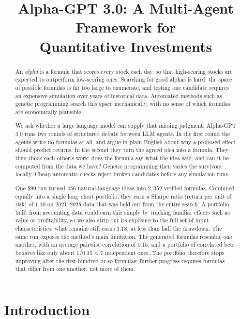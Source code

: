 \documentclass{article}
\title{Alpha-GPT 3.0: A Multi-Agent Framework for\\ Quantitative Investments}
\theoremstyle{definition}
\theoremstyle{plain}
\theoremstyle{remark}
\begin{document}
\maketitle

\begin{abstract}
An \emph{alpha} is a formula that scores every stock each day, so that high-scoring
stocks are expected to outperform low-scoring ones. Searching for good alphas is hard:
the space of possible formulas is far too large to enumerate, and testing one candidate
requires an expensive simulation over years of historical data. Automated methods such
as genetic programming search this space mechanically, with no sense of which formulas
are economically plausible.

We ask whether a large language model can supply that missing judgment. Alpha-GPT 3.0
runs two rounds of structured debate between LLM agents. In the first round the agents
write no formulas at all, and argue in plain English about why a proposed effect should
predict returns. In the second they turn the agreed idea into a formula. They then check
each other's work: does the formula say what the idea said, and can it be computed from
the data we have? Genetic programming then varies the survivors locally. Cheap automatic
checks reject broken candidates before any simulation runs.

One \$99 run turned 456 natural-language ideas into $2{,}352$ verified formulas.
Combined equally into a single long--short portfolio, they earn a Sharpe ratio (return
per unit of risk) of $1.10$ on 2021--2025 data that was held out from the entire search.
A portfolio built from accounting data could earn this simply by tracking familiar
effects such as value or profitability, so we also strip out its exposure to the full set
of input characteristics; what remains still earns $1.18$, at less than half the
drawdown. The same run exposes the method's main limitation. The generated formulas
resemble one another, with an average pairwise correlation of $0.15$, and a portfolio of
correlated bets behaves like only about $1/0.15 \approx 7$ independent ones. The
portfolio therefore stops improving after the first hundred or so formulas: further
progress requires formulas that differ from one another, not more of them.
\end{abstract}

\section{Introduction}
\end{document}
